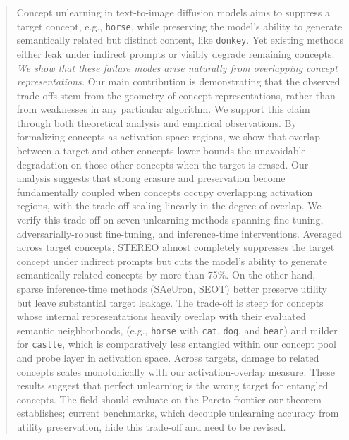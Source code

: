 \begin{abstract}
Concept unlearning in text-to-image diffusion models aims to suppress a target concept, e.g., \texttt{horse}, while preserving the model's ability to generate semantically related but distinct content, like \texttt{donkey}. Yet existing methods either leak under indirect prompts or visibly degrade remaining concepts. 
{\em We show that these failure modes arise naturally from overlapping concept representations.} Our main contribution is demonstrating that the observed trade-offs stem from the geometry of concept representations, rather than from weaknesses in any particular algorithm.
We support this claim through both theoretical analysis and empirical observations. By formalizing concepts as activation-space regions, we show that overlap between a target and other concepts lower-bounds the unavoidable degradation on those other concepts when the target is erased. 
Our analysis suggests that strong erasure and preservation become fundamentally coupled when concepts occupy overlapping activation regions, with the trade-off scaling linearly in the degree of overlap. We verify this trade-off on seven unlearning methods spanning fine-tuning, adversarially-robust fine-tuning, and inference-time interventions. Averaged across target concepts, STEREO almost completely suppresses the target concept under indirect prompts but cuts the model's ability to generate semantically related concepts by more than 75\%. On the other hand, sparse inference-time methods (SAeUron, SEOT) better preserve utility but leave substantial target leakage. The trade-off is steep for concepts whose internal representations heavily overlap with their evaluated semantic neighborhoods, (e.g., \texttt{horse} with \texttt{cat}, \texttt{dog}, and \texttt{bear}) and milder for \texttt{castle}, which is comparatively less entangled within our concept pool and probe layer in activation space. Across targets, damage to related concepts scales monotonically with our activation-overlap measure. These results suggest that perfect unlearning is the wrong target for entangled concepts. The field should evaluate on the Pareto frontier our theorem establishes; current benchmarks, which decouple unlearning accuracy from utility preservation, hide this trade-off and need to be revised.
\end{abstract}
